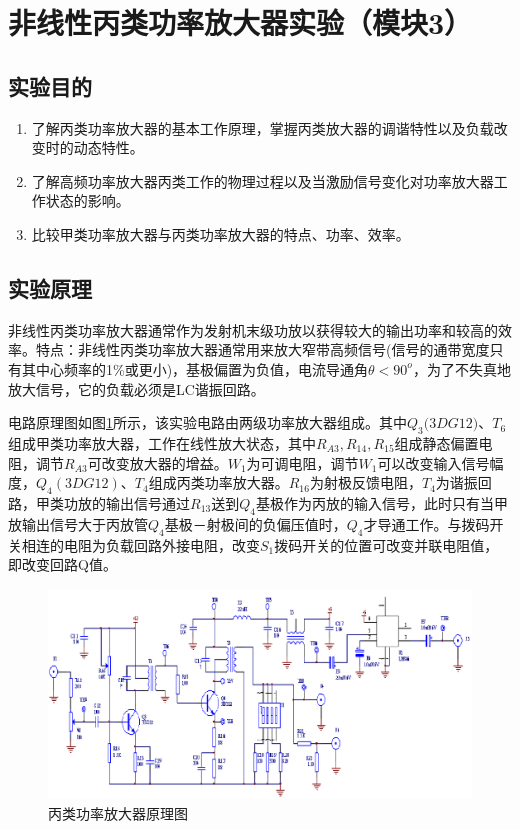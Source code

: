 \documentclass[12pt]{article}%
\numberwithin{equation}{section}
\begin{document}
\section{非线性丙类功率放大器实验（模块3）}
\setcounter{equation}{0}
\setcounter{table}{0}
\setcounter{figure}{0}
\subsection{实验目的}
\begin{enumerate}\addtolength{\itemsep}{-1.5ex}
\item 了解丙类功率放大器的基本工作原理，掌握丙类放大器的调谐特性以及负载改变时的动态特性。
\item 了解高频功率放大器丙类工作的物理过程以及当激励信号变化对功率放大器工作状态的影响。
\item 比较甲类功率放大器与丙类功率放大器的特点、功率、效率。
\end{enumerate}
\subsection{实验原理}
非线性丙类功率放大器通常作为发射机末级功放以获得较大的输出功率和较高的效率。特点：非线性丙类功率放大器通常用来放大窄带高频信号(信号的通带宽度只有其中心频率的1\%或更小)，基极偏置为负值，电流导通角$\theta<90^o$，为了不失真地放大信号，它的负载必须是LC谐振回路。\par
电路原理图如图\ref{img:bl}所示，该实验电路由两级功率放大器组成。其中$Q_3$$(3D$$G$$12)$、$T_6$组成甲类功率放大器，工作在线性放大状态，其中$R_{A3},R_{14},R_{15}$组成静态偏置电阻，调节$R_{A3}$可改变放大器的增益。$W_1$为可调电阻，调节$W_1$可以改变输入信号幅度，$Q_4(3DG12)$、$T_4$组成丙类功率放大器。$R_{16}$为射极反馈电阻，$T_4$为谐振回路，甲类功放的输出信号通过$R_{13}$送到$Q_4$基极作为丙放的输入信号，此时只有当甲放输出信号大于丙放管$Q_4$基极－射极间的负偏压值时，$Q_4$才导通工作。与拨码开关相连的电阻为负载回路外接电阻，改变$S_1$拨码开关的位置可改变并联电阻值，即改变回路Q值。
\begin{figure}[htbp]
  \centering
  \includegraphics[width=\textwidth]{image015.png} 
  \caption{ 丙类功率放大器原理图} 
  \label{img:bl} 
\end{figure}
\end{document}
